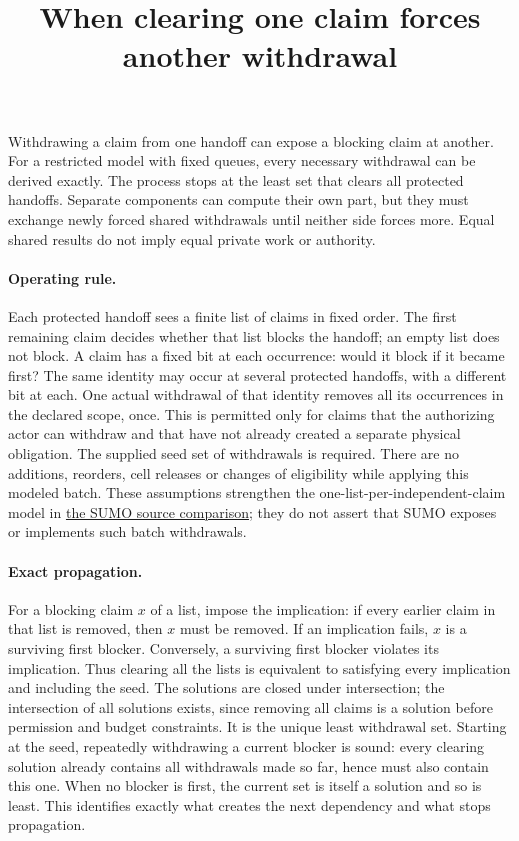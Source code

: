 \documentclass[11pt]{article}
\title{When clearing one claim forces another withdrawal}
\author{}
\date{}
\begin{document}
\maketitle

Withdrawing a claim from one handoff can expose a blocking claim at another. For a restricted model with fixed queues, every necessary withdrawal can be derived exactly. The process stops at the least set that clears all protected handoffs. Separate components can compute their own part, but they must exchange newly forced shared withdrawals until neither side forces more. Equal shared results do not imply equal private work or authority.

\paragraph{Operating rule.}
Each protected handoff sees a finite list of claims in fixed order. The first remaining claim decides whether that list blocks the handoff; an empty list does not block. A claim has a fixed bit at each occurrence: would it block if it became first? The same identity may occur at several protected handoffs, with a different bit at each. One actual withdrawal of that identity removes all its occurrences in the declared scope, once. This is permitted only for claims that the authorizing actor can withdraw and that have not already created a separate physical obligation. The supplied seed set of withdrawals is required. There are no additions, reorders, cell releases or changes of eligibility while applying this modeled batch. These assumptions strengthen the one-list-per-independent-claim model in \href{https://github.com/eternal-november/eos-research-programmes/pull/431}{the SUMO source comparison}; they do not assert that SUMO exposes or implements such batch withdrawals.

\paragraph{Exact propagation.}
For a blocking claim $x$ of a list, impose the implication: if every earlier claim in that list is removed, then $x$ must be removed. If an implication fails, $x$ is a surviving first blocker. Conversely, a surviving first blocker violates its implication. Thus clearing all the lists is equivalent to satisfying every implication and including the seed. The solutions are closed under intersection; the intersection of all solutions exists, since removing all claims is a solution before permission and budget constraints. It is the unique least withdrawal set. Starting at the seed, repeatedly withdrawing a current blocker is sound: every clearing solution already contains all withdrawals made so far, hence must also contain this one. When no blocker is first, the current set is itself a solution and so is least. This identifies exactly what creates the next dependency and what stops propagation.
\end{document}
